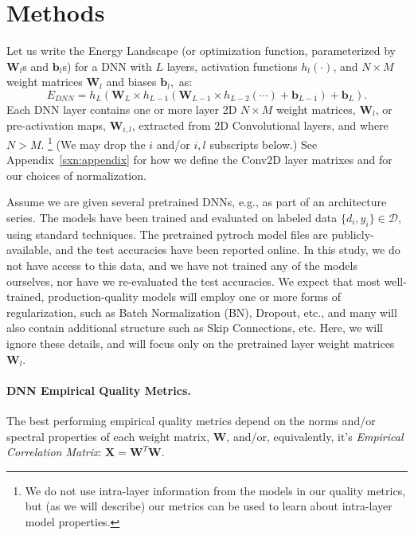 \section{Methods}
\label{sxn:methods}


Let us write the Energy Landscape (or optimization function, parameterized by $\mathbf{W}_{l}$s and $\mathbf{b}_{l}$s) for a DNN with $L$ layers, activation functions $h_{l}(\cdot)$, and $N\times M$ weight matrices $\mathbf{W}_{l}$ and biases $\mathbf{b}_{l}$,~as:
\begin{equation}
E_{DNN}=h_{L}(\mathbf{W}_{L}\times h_{L-1}(\mathbf{W}_{L-1}\times h_{L-2}(\cdots)+\mathbf{b}_{L-1})+\mathbf{b}_{L})  .
\label{eqn:dnn_energy}
\end{equation}
Each DNN layer contains one or more layer 2D  $N\times M$ weight matrices, $\mathbf{W}_{l}$, or pre-activation maps, $\mathbf{W}_{i,l}$, extracted from 2D Convolutional layers, and where $N > M$.%
\footnote{We do not use intra-layer information from the models in our quality metrics, but (as we will describe) our metrics can be used to learn about intra-layer model properties.}
(We may drop the $i$ and/or $i,l$ subscripts below.)
See Appendix~\ref{sxn:appendix} for how we define the Conv2D layer matrixes and for our choices of normalization. 

Assume we are given several pretrained DNNs, e.g., as part of an architecture series.
The models have been trained and evaluated on labeled data $\{d_{i},y_{i}\}\in\mathcal{D}$, using standard techniques.  
The pretrained pytroch model files are publicly-available, and the test accuracies have been reported online.  
In this study, we do not have access to this data, and we have not trained any of the models ourselves,
nor have we re-evaluated the test accuracies.
We expect that most well-trained, production-quality models will employ one or more forms of regularization, such as Batch Normalization (BN), Dropout, etc., and many will also contain additional structure such as Skip Connections, etc. 
Here, we will ignore these details, and will focus only on the pretrained layer weight matrices $\mathbf{W}_{l}$.


\paragraph{DNN Empirical Quality Metrics.}

The best performing empirical quality metrics depend on the norms and/or spectral properties of each weight matrix,
$\mathbf{W}$, and/or, equivalently, it's \emph{Empirical Correlation Matrix}: $\mathbf{X}=\mathbf{W}^{T}\mathbf{W}$.


